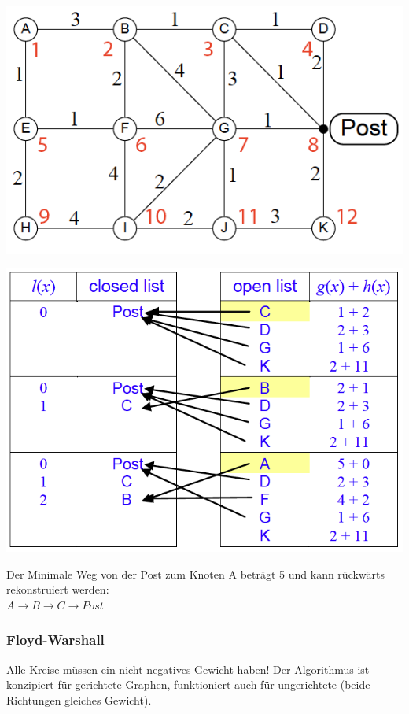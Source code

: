 \begin{minipage}{0.5\textwidth}
	\includegraphics[width=\textwidth]{Content/Graphen/PostAStar.png}
\end{minipage}
\hfill
\begin{minipage}{0.5\textwidth}
	\includegraphics[width=\textwidth]{Content/Graphen/AStar.png}
\end{minipage}

Der Minimale Weg von der Post zum Knoten A beträgt 5 und kann rückwärts rekonstruiert werden:\\ $A\rightarrow B\rightarrow C \rightarrow Post$\\

\subsubsection{Floyd-Warshall}
Alle Kreise müssen ein nicht negatives Gewicht haben! Der Algorithmus ist konzipiert für gerichtete Graphen, funktioniert auch für ungerichtete (beide Richtungen gleiches Gewicht).

